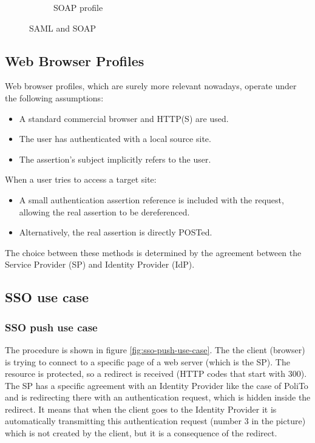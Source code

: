\begin{figure}[H]
\begin{subfigure}{.4\textwidth}
    \caption{SOAP profile}
    \label{fig:soap-profile}
  \end{subfigure}
  \caption{SAML and SOAP}
\end{figure}


\subsection{Web Browser Profiles}

Web browser profiles, which are surely more relevant nowadays, operate
under the following assumptions:
\begin{itemize}
    \item A standard commercial browser and HTTP(S) are used.
    \item The user has authenticated with a local source site.
    \item The assertion’s subject implicitly refers to the user.
\end{itemize}

When a user tries to access a target site:
\begin{itemize}
    \item A small authentication assertion reference is included with
      the request, allowing the real assertion to be dereferenced.
    \item Alternatively, the real assertion is directly POSTed.
\end{itemize}

The choice between these methods is determined by the agreement
between the Service Provider (SP) and Identity Provider (IdP).

\subsection{SSO use case}
\subsubsection{SSO push use case}
The procedure is shown in figure \ref{fig:sso-push-use-case}. The the
client (browser) is trying to connect  to a specific page of a web
server (which is the SP). The resource is protected, so a redirect is
received (HTTP codes that start with 300). The SP has a specific
agreement with an Identity Provider like the case of PoliTo and is
redirecting there with an authentication request, which is hidden
inside the redirect. It means that when the client goes to the
Identity Provider it is automatically transmitting this authentication
request (number 3 in the picture) which is not created by the client,
but it is a consequence of the redirect.

